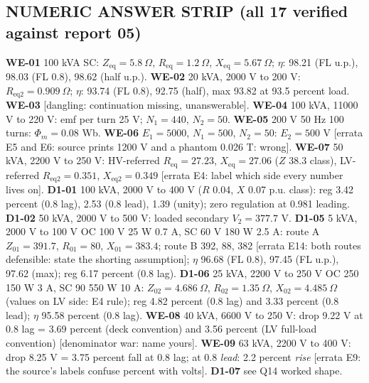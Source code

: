 \documentclass[11pt]{article}
\begin{document}
\subsection*{\color{copper}NUMERIC ANSWER STRIP (all 17 verified against report 05)}
\textbf{WE-01} 100 kVA SC: $Z_{\text{eq}} = 5.8\ \Omega$, $R_{\text{eq}} = 1.2\ \Omega$, $X_{\text{eq}} = 5.67\ \Omega$; $\eta$: 98.21 (FL u.p.), 98.03 (FL 0.8), 98.62 (half u.p.). \textbf{WE-02} 20 kVA, 2000 V to 200 V: $R_{\text{eq2}} = 0.909\ \Omega$; $\eta$: 93.74 (FL 0.8), 92.75 (half), max 93.82 at 93.5 percent load. \textbf{WE-03} [dangling: continuation missing, unanswerable]. \textbf{WE-04} 100 kVA, 11000 V to 220 V: emf per turn 25 V; $N_1 = 440$, $N_2 = 50$. \textbf{WE-05} 200 V 50 Hz 100 turns: $\Phi_m = 0.08$ Wb. \textbf{WE-06} $E_1 = 5000$, $N_1 = 500$, $N_2 = 50$: $E_2 = 500$ V [errata E5 and E6: source prints 1200 V and a phantom 0.026 T: wrong]. \textbf{WE-07} 50 kVA, 2200 V to 250 V: HV-referred $R_{\text{eq}} = 27.23$, $X_{\text{eq}} = 27.06$ ($Z$ 38.3 class), LV-referred $R_{\text{eq2}} = 0.351$, $X_{\text{eq2}} = 0.349$ [errata E4: label which side every number lives on]. \textbf{D1-01} 100 kVA, 2000 V to 400 V ($R$ 0.04, $X$ 0.07 p.u. class): reg 3.42 percent (0.8 lag), 2.53 (0.8 lead), 1.39 (unity); zero regulation at 0.981 leading. \textbf{D1-02} 50 kVA, 2000 V to 500 V: loaded secondary $V_2 = 377.7$ V. \textbf{D1-05} 5 kVA, 2000 V to 100 V OC 100 V 25 W 0.7 A, SC 60 V 180 W 2.5 A: route A $Z_{01} = 391.7$, $R_{01} = 80$, $X_{01} = 383.4$; route B 392, 88, 382 [errata E14: both routes defensible: state the shorting assumption]; $\eta$ 96.68 (FL 0.8), 97.45 (FL u.p.), 97.62 (max); reg 6.17 percent (0.8 lag). \textbf{D1-06} 25 kVA, 2200 V to 250 V OC 250 150 W 3 A, SC 90 550 W 10 A: $Z_{02} = 4.686\ \Omega$, $R_{02} = 1.35\ \Omega$, $X_{02} = 4.485\ \Omega$ (values on LV side: E4 rule); reg 4.82 percent (0.8 lag) and 3.33 percent (0.8 lead); $\eta$ 95.58 percent (0.8 lag). \textbf{WE-08} 40 kVA, 6600 V to 250 V: drop 9.22 V at 0.8 lag = 3.69 percent (deck convention) and 3.56 percent (LV full-load convention) [denominator war: name yours]. \textbf{WE-09} 63 kVA, 2200 V to 400 V: drop 8.25 V = 3.75 percent fall at 0.8 lag; at 0.8 \emph{lead}: 2.2 percent \emph{rise} [errata E9: the source's labels confuse percent with volts]. \textbf{D1-07} see Q14 worked shape.
\end{document}
